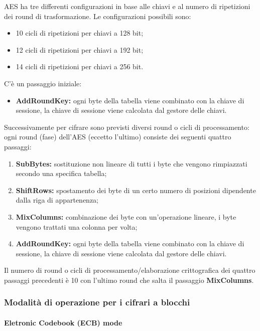 AES ha tre differenti configurazioni in base alle chiavi e al numero di
ripetizioni dei round di trasformazione. Le configurazioni possibili sono:
\begin{itemize}
 \item 10 cicli di ripetizioni per chiavi a 128 bit;
 \item 12 cicli di ripetizioni per chiavi a 192 bit;
 \item 14 cicli di ripetizioni per chiavi a 256 bit.
\end{itemize}


C'è un passaggio iniziale:
\begin{itemize}
\item \textbf{AddRoundKey:} ogni byte della tabella viene combinato con la chiave di sessione, la chiave di sessione viene calcolata dal gestore delle chiavi.
\end{itemize}


Successivamente per cifrare sono previsti diversi round o cicli di processamento: ogni round (fase) dell'AES (eccetto l'ultimo) consiste dei seguenti quattro passaggi:

\begin{enumerate}
\item \textbf{SubBytes:} sostituzione non lineare di tutti i byte che vengono rimpiazzati secondo una specifica tabella;
\item \textbf{ShiftRows:} spostamento dei byte di un certo numero di posizioni dipendente dalla riga di appartenenza;
\item \textbf{MixColumns:} combinazione dei byte con un'operazione lineare, i byte vengono trattati una colonna per volta;
\item \textbf{AddRoundKey:} ogni byte della tabella viene combinato con la chiave di sessione, la chiave di sessione viene calcolata dal gestore delle chiavi.
\end{enumerate}

Il numero di round o cicli di processamento/elaborazione crittografica dei quattro passaggi precedenti è 10 con l'ultimo round che salta il passaggio \textbf{MixColumns}.

\subsubsection{Modalità di operazione per i cifrari a blocchi}

\paragraph{Eletronic Codebook (ECB) mode}

